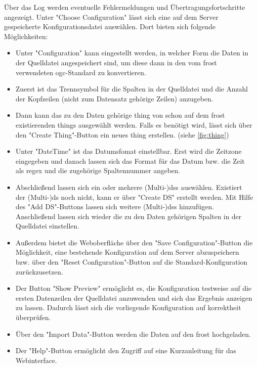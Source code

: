 \documentclass[a4paper, 12 pt]{article}
\begin{document}
Über das Log werden eventuelle Fehlermeldungen und Übertragungsfortschritte angezeigt. Unter \string"Choose Configuration\string" lässt sich eine auf dem Server gespeicherte Konfigurationsdatei auswählen. Dort bieten sich folgende Möglichkeiten:
\begin{itemize}
\item Unter "{Configuration}" kann eingestellt werden, in welcher Form die Daten in der Quelldatei angespeichert sind, um diese dann in den vom \gls{frost} verwendeten \gls{ogc}-Standard zu konvertieren.
\item Zuerst ist das Trennsymbol für die Spalten in der Quelldatei und die Anzahl der Kopfzeilen (nicht zum Datensatz gehörige Zeilen) anzugeben. 
\item Dann kann das zu den Daten gehörige \gls{thing} von schon auf dem \gls{frost} existierenden \glspl{thing} ausgewählt werden. Falls es benötigt wird, lässt sich über den "{Create Thing}"{-Button} ein neues \gls{thing} erstellen. (siehe \cref{fig:thing})
\item Unter "{DateTime}"{ ist} das Datumsfomat einstellbar. Erst wird die Zeitzone eingegeben und danach lassen sich das Format für das Datum bzw. die Zeit als \gls{regex} und die zugehörige Spaltennummer angeben.
\item Abschließend lassen sich ein oder mehrere (Multi-)\glspl{ds} auswählen. Existiert der (Multi-)\gls{ds} noch nicht, kann er über "{Create DS}"{ erstellt} werden. Mit Hilfe des "{Add DS}"{-Buttons} lassen sich weitere (Multi-)\glspl{ds} hinzufügen. Anschließend lassen sich wieder die zu den Daten gehörigen Spalten in der Quelldatei einstellen.
\item Außerdem bietet die Weboberfläche über den "{Save Configuration}"{-Button} die Möglichkeit, eine bestehende Konfiguration auf dem Server abzuspeichern bzw. über den "{Reset Configuration}"{-Button} auf die Standard-Konfiguration zurückzusetzen.
\item Der Button "{Show Preview}"{ ermöglicht} es, die Konfiguration testweise auf die ersten Datenzeilen der Quelldatei anzuwenden und sich das Ergebnis anzeigen zu lassen. Dadurch lässt sich die vorliegende Konfiguration auf korrektheit überprüfen.
\item Über den "{Import Data}"{-Button} werden die Daten auf den \gls{frost} hochgeladen.
\item Der "{Help}"{-Button} ermöglicht den Zugriff auf eine Kurzanleitung für das Webinterface.
\end{itemize}
\end{document}

